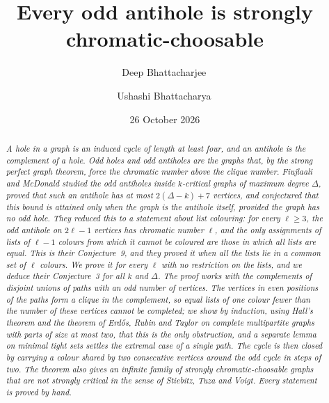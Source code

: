 \documentclass[11pt,a4paper,reqno]{amsart}
\title[Every odd antihole is strongly chromatic-choosable]{Every odd antihole is strongly chromatic-choosable}
\author{Deep Bhattacharjee\,\orcidlink{0000-0003-0466-750X}}
\author{Ushashi Bhattacharya\,\orcidlink{0009-0002-2254-3914}}
\date{26 October 2026}
\theoremstyle{definition}
\theoremstyle{remark}
\begin{document}
\begin{abstract}
\itshape
A hole in a graph is an induced cycle of length at least four, and an antihole is the complement of a hole. Odd holes and odd antiholes are the graphs that, by the strong perfect graph theorem, force the chromatic number above the clique number. Fiujlaali and McDonald studied the odd antiholes inside $k$-critical graphs of maximum degree $\Delta$, proved that such an antihole has at most $2(\Delta-k)+7$ vertices, and conjectured that this bound is attained only when the graph is the antihole itself, provided the graph has no odd hole. They reduced this to a statement about list colouring: for every $\ell\ge3$, the odd antihole on $2\ell-1$ vertices has chromatic number $\ell$, and the only assignments of lists of $\ell-1$ colours from which it cannot be coloured are those in which all lists are equal. This is their Conjecture~9, and they proved it when all the lists lie in a common set of $\ell$ colours. We prove it for every $\ell$ with no restriction on the lists, and we deduce their Conjecture~3 for all $k$ and $\Delta$. The proof works with the complements of disjoint unions of paths with an odd number of vertices. The vertices in even positions of the paths form a clique in the complement, so equal lists of one colour fewer than the number of these vertices cannot be completed; we show by induction, using Hall's theorem and the theorem of Erd\H{o}s, Rubin and Taylor on complete multipartite graphs with parts of size at most two, that this is the only obstruction, and a separate lemma on minimal tight sets settles the extremal case of a single path. The cycle is then closed by carrying a colour shared by two consecutive vertices around the odd cycle in steps of two. The theorem also gives an infinite family of strongly chromatic-choosable graphs that are not strongly critical in the sense of Stiebitz, Tuza and Voigt. Every statement is proved by hand.
\end{abstract}

\maketitle
\end{document}
